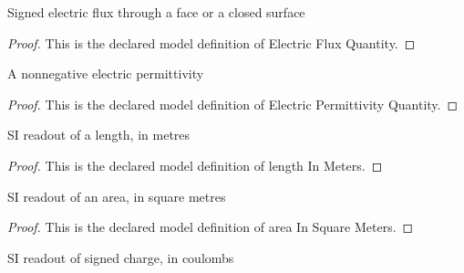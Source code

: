 \begin{definition}
  \label{def:physics:phyx-mini-0841:phyxminiproblems-problemphyxmini0841-electricfluxquantity}
  Signed electric flux through a face or a closed surface
\end{definition}
\begin{proof}
  This is the declared model definition of Electric Flux Quantity.
\end{proof}
\begin{definition}
  \label{def:physics:phyx-mini-0841:phyxminiproblems-problemphyxmini0841-electricpermittivityquantity}
  A nonnegative electric permittivity
\end{definition}
\begin{proof}
  This is the declared model definition of Electric Permittivity Quantity.
\end{proof}
\begin{definition}
  \label{def:physics:phyx-mini-0841:phyxminiproblems-problemphyxmini0841-lengthinmeters}
  SI readout of a length, in metres
\end{definition}
\begin{proof}
  This is the declared model definition of length In Meters.
\end{proof}
\begin{definition}
  \label{def:physics:phyx-mini-0841:phyxminiproblems-problemphyxmini0841-areainsquaremeters}
  SI readout of an area, in square metres
\end{definition}
\begin{proof}
  This is the declared model definition of area In Square Meters.
\end{proof}
\begin{definition}
  \label{def:physics:phyx-mini-0841:phyxminiproblems-problemphyxmini0841-chargeincoulombs}
  SI readout of signed charge, in coulombs
\end{definition}

